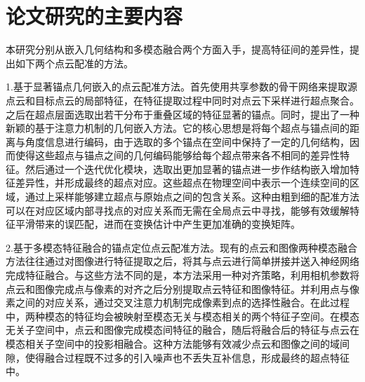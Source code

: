 \section{论文研究的主要内容}
本研究分别从嵌入几何结构和多模态融合两个方面入手，提高特征间的差异性，提出如下两个点云配准的方法。\par
1.基于显著锚点几何嵌入的点云配准方法。首先使用共享参数的骨干网络来提取源点云和目标点云的局部特征，在特征提取过程中同时对点云下采样进行超点聚合。之后在超点层面选取出若干分布于重叠区域的特征显著的锚点。同时，提出了一种新颖的基于注意力机制的几何嵌入方法。它的核心思想是将每个超点与锚点间的距离与角度信息进行编码，由于选取的多个锚点在空间中保持了一定的几何结构，因而使得这些超点与锚点之间的几何编码能够给每个超点带来各不相同的差异性特征。然后通过一个迭代优化模块，选取出更加显著的锚点进一步作结构嵌入增加特征差异性，并形成最终的超点对应。这些超点在物理空间中表示一个连续空间的区域，通过上采样能够建立超点与原始点之间的包含关系。这种由粗到细的配准方法可以在对应区域内部寻找点的对应关系而无需在全局点云中寻找，能够有效缓解特征平滑带来的误匹配，进而在变换估计中产生更加准确的变换矩阵。\par
2.基于多模态特征融合的锚点定位点云配准方法。现有的点云和图像两种模态融合方法往往通过对图像进行特征提取之后，将其与点云进行简单拼接并送入神经网络完成特征融合。与这些方法不同的是，本方法采用一种对齐策略，利用相机参数将点云和图像完成点与像素的对齐之后分别提取点云特征和图像特征。并利用点与像素之间的对应关系，通过交叉注意力机制完成像素到点的选择性融合。在此过程中，两种模态的特征均会被映射至模态无关与模态相关的两个特征子空间。在模态无关子空间中，点云和图像完成模态间特征的融合，随后将融合后的特征与点云在模态相关子空间中的投影相融合。这种方法能够有效减少点云和图像之间的域间隙，使得融合过程既不过多的引入噪声也不丢失互补信息，形成最终的超点特征中。
